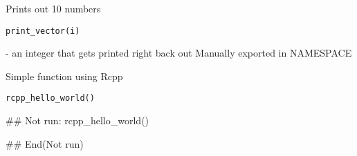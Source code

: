 \documentclass[a4paper]{book}
\begin{document}
%
\begin{Description}
Prints out 10 numbers
\end{Description}
%
\begin{Usage}
\begin{verbatim}
print_vector(i)
\end{verbatim}
\end{Usage}
%
\begin{Arguments}
\begin{ldescription}
\item[\code{i}] - an integer that gets printed right back out
Manually exported in NAMESPACE
\end{ldescription}
\end{Arguments}
%
\begin{Description}
Simple function using Rcpp
\end{Description}
%
\begin{Usage}
\begin{verbatim}
rcpp_hello_world()	
\end{verbatim}
\end{Usage}
%
\begin{Examples}
\begin{ExampleCode}
## Not run: 
rcpp_hello_world()

## End(Not run)
\end{ExampleCode}
\end{Examples}
\printindex{}
\end{document}
